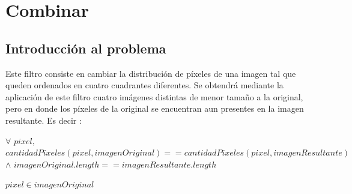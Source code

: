 \section{Combinar}
\subsection{Introducción al problema}
Este filtro consiste en cambiar la distribución de píxeles de una imagen tal que queden ordenados en cuatro cuadrantes diferentes. Se obtendrá mediante la aplicación de este filtro cuatro imágenes distintas de menor tamaño a la original, pero en donde los píxeles de la original se encuentran aun presentes en la imagen resultante. Es decir : 
\begin{center}
$\forall$ $pixel,$ $cantidadPixeles(pixel, imagenOriginal) == cantidadPixeles(pixel,imagenResultante)$ 
$\wedge$ $imagenOriginal.length == imagenResultante.length$ 
\end{center}
\begin{flushright}
 $pixel \in imagenOriginal$
\end{flushright}

